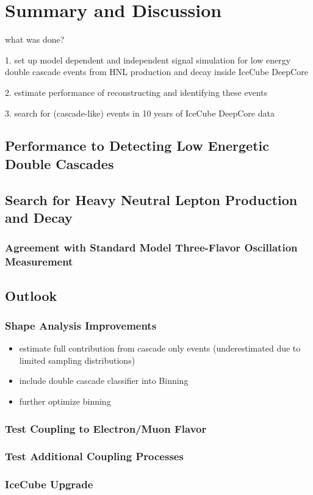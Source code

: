 \setchapterpreamble[u]{\margintoc}

\chapter{Summary and Discussion}

what was done?

1. set up model dependent and independent signal simulation for low energy double cascade events from HNL production and decay inside IceCube DeepCore

2. estimate performance of reconstructing and identifying these events

3. search for (cascade-like) events in 10 years of IceCube DeepCore data


\section{Performance to Detecting Low Energetic Double Cascades}


\section{Search for Heavy Neutral Lepton Production and Decay}

\subsection{Agreement with Standard Model Three-Flavor Oscillation Measurement}


\section{Outlook}

\subsection{Shape Analysis Improvements}

\begin{itemize}
    \item estimate full contribution from cascade only events (underestimated due to limited sampling distributions)
    \item include double cascade classifier into Binning
    \item further optimize binning
\end{itemize}

\subsection{Test Coupling to Electron/Muon Flavor}

\subsection{Test Additional Coupling Processes}

\subsection{IceCube Upgrade}
